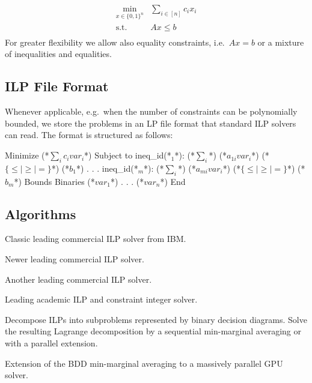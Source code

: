 \begin{equation}
    \tag{ILP}
    \begin{array}{rl}
    \min_{x \in \{0,1\}^n}
    & \sum_{i\in[n]} c_i x_i \\
    \text{s.t.}
    & Ax \leq b \\
    \end{array}
\end{equation}
For greater flexibility we allow also equality constraints, i.e.\  $Ax = b$ or a mixture of inequalities and equalities.

\subsection{ILP File Format}
\label{sec:ilp-file-format}
Whenever applicable, e.g.\ when the number of constraints can be polynomially bounded, we store the problems in an LP file format that standard ILP solvers can read.
The format is structured as follows:

{\small
\begin{fileformat}
Minimize
(*$\sum\limits_i c_i var_i$*)
Subject to
ineq_id(*${}_1$*): (*$\sum\limits_{i}$*) (*$a_{1i} var_{i}$*)  (*$\{\leq|\geq|=\}$*) (*$b_1$*)
.
.
.
ineq_id(*${}_m$*): (*$\sum\limits_{i}$*) (*$a_{mi} var_{i}$*)  (*$\{\leq|\geq|=\}$*) (*$b_m$*)
Bounds
Binaries
(*$var_1$*)
.
.
.
(*$var_n$*)
End
\end{fileformat}
}

\subsection{Algorithms}
\begin{description}[style=unboxed]
\item[CPLEX~\cite{cplex}:] Classic leading commercial ILP solver from IBM.
\item[Gurobi~\cite{gurobi}:] Newer leading commercial ILP solver.
\item[Mosek~\cite{mosek}:] Another leading commercial ILP solver.
\item[SCIP~\cite{achterberg2009scip}:] Leading academic ILP and constraint integer solver.
\item[BDD Min-Marginal Averaging~\cite{lange2021efficient}:]
Decompose ILPs into subproblems represented by binary decision diagrams. Solve the resulting Lagrange decomposition by a sequential min-marginal averaging or with a parallel extension.
\item[Fast Discrete Optimization on GPU (1astDOG)~\cite{abbas2022fastdog}:] Extension of the BDD min-marginal averaging to a massively parallel GPU solver.
\end{description}
